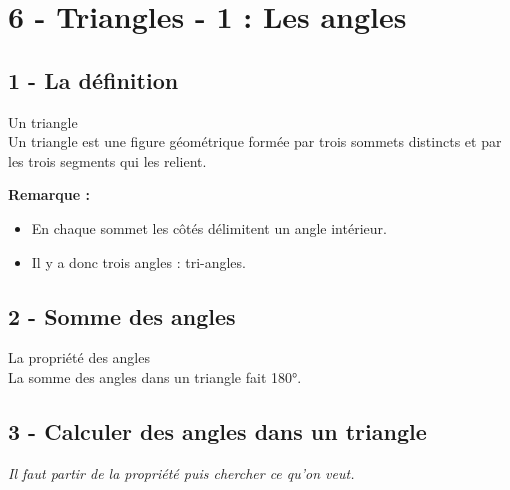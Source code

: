 



\section*{6 - Triangles - 1 : Les angles}

\subsection*{1 - La définition}

\begin{Definition}{Un triangle}\\
 Un triangle est une figure géométrique formée par trois sommets distincts et par les trois segments qui les relient.
\end{Definition}

\textbf{Remarque : }

\begin{itemize}[label={$\bullet$}]
  \item En chaque sommet les côtés délimitent un angle intérieur. 
  \item Il y a donc trois angles : tri-angles.
\end{itemize}


\subsection*{2 - Somme des angles}

\begin{Definition}{La propriété des angles}\\
  La somme des angles dans un triangle fait 180°.
\end{Definition}


\subsection*{3 - Calculer des angles dans un triangle}

\textit{Il faut partir de la propriété puis chercher ce qu'on veut.} \\

